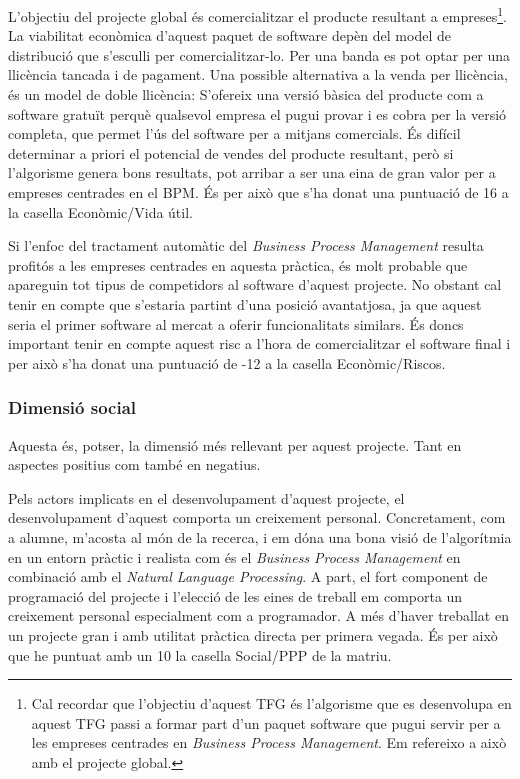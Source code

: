 L'objectiu del projecte global és comercialitzar el producte resultant a empreses\footnote{Cal recordar que l'objectiu d'aquest TFG és l'algorisme que es desenvolupa en aquest TFG passi a formar part d'un paquet software que pugui servir per a les empreses centrades en \emph{Business Process Management}. Em refereixo a això amb el projecte global.}. La viabilitat econòmica d'aquest paquet de software depèn del model de distribució que s'esculli per comercialitzar-lo. Per una banda es pot optar per una llicència tancada i de pagament. Una possible alternativa a la venda per llicència, és un model de doble llicència: S'ofereix una versió bàsica del producte com a software gratuït perquè qualsevol empresa el pugui provar i es cobra per la versió completa, que permet l'ús del software per a mitjans comercials. És difícil determinar a priori el potencial de vendes del producte resultant, però si l'algorisme genera bons resultats, pot arribar a ser una eina de gran valor per a empreses centrades en el BPM. És per això que s'ha donat una puntuació de 16 a la casella Econòmic/Vida útil.

Si l'enfoc del tractament automàtic del \emph{Business Process Management} resulta profitós a les empreses centrades en aquesta pràctica, és molt probable que apareguin tot tipus de competidors al software d'aquest projecte. No obstant cal tenir en compte que s'estaria partint d'una posició avantatjosa, ja que aquest seria el primer software al mercat a oferir funcionalitats similars. És doncs important tenir en compte aquest risc a l'hora de comercialitzar el software final i per això s'ha donat una puntuació de -12 a la casella Econòmic/Riscos.

\subsubsection{Dimensió social}

Aquesta és, potser, la dimensió més rellevant per aquest projecte. Tant en aspectes positius com també en negatius.

Pels actors implicats en el desenvolupament d'aquest projecte, el desenvolupament d'aquest comporta un creixement personal. Concretament, com a alumne, m'acosta al món de la recerca, i em dóna una bona visió de l'algorítmia en un entorn pràctic i realista com és el \emph{Business Process Management} en combinació amb el \emph{Natural Language Processing}. A part, el fort component de programació del projecte i l'elecció de les eines de treball em comporta un creixement personal especialment com a programador. A més d'haver treballat en un projecte gran i amb utilitat pràctica directa per primera vegada. És per això que he puntuat amb un 10 la casella Social/PPP de la matriu.

